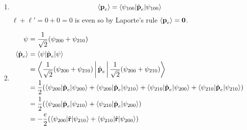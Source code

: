 \documentclass{article}
\renewcommand{\vec}[1]{\boldsymbol{\mathbf{#1}}}
\newcommand{\uvec}[1]{\hat{\vec{#1}}}
\begin{document}
\begin{enumerate}
  \item \[\braket{\vec{p}_e} = \braket{\psi_{1 0 0} | \uvec{p}_e | \psi_{1 0 0}}\] $\ell + \ell' = 0 + 0 = 0$ is even so by Laporte's rule $\braket{\vec{p}_e} = \vec{0}$.

  \item

        \begin{align*}
          \psi                & = \frac{1}{\sqrt{2}} (\psi_{2 0 0} + \psi_{2 1 0})                                                                                                                                                                            \\
          \braket{\uvec{p}_e} & = \braket{\psi | \uvec{p}_e | \psi}                                                                                                                                                                                           \\
                              & = \Braket{\frac{1}{\sqrt{2}} (\psi_{2 0 0} + \psi_{2 1 0}) | \uvec{p}_e | \frac{1}{\sqrt{2}} (\psi_{2 0 0} + \psi_{2 1 0})}                                                                                                   \\
                              & = \frac{1}{2} (\braket{\psi_{2 0 0} | \uvec{p}_e | \psi_{2 0 0}} + \braket{\psi_{2 0 0} | \uvec{p}_e | \psi_{2 1 0}} + \braket{\psi_{2 1 0} | \uvec{p}_e | \psi_{2 0 0}} + \braket{\psi_{2 1 0} | \uvec{p}_e | \psi_{2 1 0}}) \\
                              & = \frac{1}{2} (\braket{\psi_{2 0 0} | \uvec{p}_e | \psi_{2 1 0}} + \braket{\psi_{2 1 0} | \uvec{p}_e | \psi_{2 0 0}})                                                                                                         \\
                              & = -\frac{e}{2} (\braket{\psi_{2 0 0} | \uvec{r} | \psi_{2 1 0}} + \braket{\psi_{2 1 0} | \uvec{r} | \psi_{2 0 0}})                                                                                                            \\
        \end{align*}
\end{enumerate}
\end{document}
